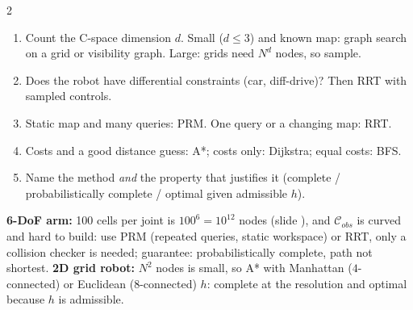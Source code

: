 \begin{multicols}{2}
\normalsize
\begin{recipe}
\begin{enumerate}
\item Count the C-space dimension $d$. Small ($d\le3$) and known map: graph search on a grid or visibility graph. Large: grids need $N^d$ nodes, so sample.
\item Does the robot have differential constraints (car, diff-drive)? Then RRT with sampled controls.
\item Static map and many queries: PRM. One query or a changing map: RRT.
\item Costs and a good distance guess: A*; costs only: Dijkstra; equal costs: BFS.
\item Name the method \emph{and} the property that justifies it (complete / probabilistically complete / optimal given admissible $h$).
\end{enumerate}
\end{recipe}
\textbf{6-DoF arm:} 100 cells per joint is $100^6=10^{12}$ nodes (slide ), and $\mathcal C_{obs}$ is curved and hard to build: use PRM (repeated queries, static workspace) or RRT, only a collision checker is needed; guarantee: probabilistically complete, path not shortest. \textbf{2D grid robot:} $N^2$ nodes is small, so A* with Manhattan ($4$-connected) or Euclidean ($8$-connected) $h$: complete at the resolution and optimal because $h$ is admissible.


\end{multicols}
